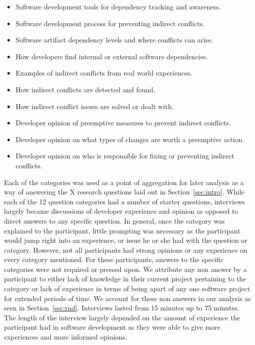 \documentclass[conference]{IEEEtran}
\begin{document}
\begin{itemize}
\item Software development tools for dependency tracking and awareness.
\item Software development process for preventing indirect conflicts.
\item Software artifact dependency levels and where conflicts can arise.
\item How developers find internal or external software dependencies.
\item Examples of indirect conflicts from real world experiences.
\item How indirect conflicts are detected and found.
\item How indirect conflict issues are solved or dealt with.
\item Developer opinion of preemptive measures to prevent indirect conflicts.
\item Developer opinion on what types of changes are worth a preemptive action.
\item Developer opinion on who is responsible for fixing or preventing indirect conflicts.
\end{itemize}

Each of the categories was used as a
point of aggregation for later analysis as a way of answering the X research questions laid out in 
Section~\ref{sec:intro}. While each of the 12 question categories had a number of starter questions, interviews 
largely became discussions of developer experience and opinion as opposed to direct answers to any specific question.
In general, once the category was explained to the participant, little prompting was necessary as the participant
would jump right into an experience, or issue he or she had with the question or category. However, not all
participants had strong opinions or any experience on every category mentioned. For these participants, answers 
to the specific categories were not required or pressed upon. We attribute any non answer by a participant to
either lack of knowledge in their current project pertaining to the category or lack of experience in terms of
being apart of any one software project for extended periods of time. We account for these non answers
in our analysis as seen in Section~\ref{sec:rnd}. Interviews lasted 
from 15 minutes up to 75 minutes. The length of the interview largely depended on the amount of experience the
participant had in software development as they were able to give more experiences and more informed opinions.
\end{document}

